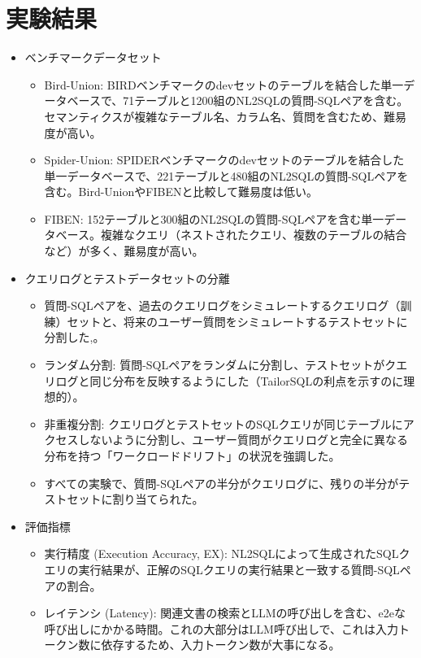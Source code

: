 \documentclass[dvipdfmx,uplatex]{jsarticle}
\theoremstyle{remark}
\newenvironment{experiment}[1]{
    \begin{tcolorbox}[
        colframe=violet,
        colback=violet!10!white,
        colbacktitle=violet!40!white,
        coltitle=black,
        fonttitle=\bfseries,
        title={#1}
    ]
}{
    \end{tcolorbox}
}
\begin{document}
\section{実験結果}
\begin{experiment}{実験手法}
\begin{itemize}
    \item ベンチマークデータセット
    \begin{itemize}
        \item Bird-Union: BIRDベンチマークのdevセットのテーブルを結合した単一データベースで、71テーブルと1200組のNL2SQLの質問-SQLペアを含む。セマンティクスが複雑なテーブル名、カラム名、質問を含むため、難易度が高い。
        \item Spider-Union: SPIDERベンチマークのdevセットのテーブルを結合した単一データベースで、221テーブルと480組のNL2SQLの質問-SQLペアを含む。Bird-UnionやFIBENと比較して難易度は低い。
        \item FIBEN: 152テーブルと300組のNL2SQLの質問-SQLペアを含む単一データベース。複雑なクエリ（ネストされたクエリ、複数のテーブルの結合など）が多く、難易度が高い。
    \end{itemize}
    \item クエリログとテストデータセットの分離
    \begin{itemize}
        \item 質問-SQLペアを、過去のクエリログをシミュレートするクエリログ（訓練）セットと、将来のユーザー質問をシミュレートするテストセットに分割した,。
        \item ランダム分割: 質問-SQLペアをランダムに分割し、テストセットがクエリログと同じ分布を反映するようにした（TailorSQLの利点を示すのに理想的）。
        \item 非重複分割: クエリログとテストセットのSQLクエリが同じテーブルにアクセスしないように分割し、ユーザー質問がクエリログと完全に異なる分布を持つ「ワークロードドリフト」の状況を強調した。
        \item すべての実験で、質問-SQLペアの半分がクエリログに、残りの半分がテストセットに割り当てられた。
    \end{itemize}
    \item 評価指標
    \begin{itemize}
        \item 実行精度 (Execution Accuracy, EX): NL2SQLによって生成されたSQLクエリの実行結果が、正解のSQLクエリの実行結果と一致する質問-SQLペアの割合。
        \item レイテンシ (Latency): 関連文書の検索とLLMの呼び出しを含む、e2eな呼び出しにかかる時間。これの大部分はLLM呼び出しで、これは入力トークン数に依存するため、入力トークン数が大事になる。
    \end{itemize}
\end{itemize}
\end{experiment}
\end{document}
